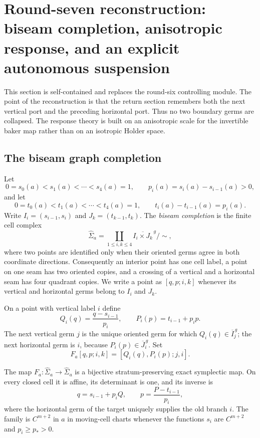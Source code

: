 \section{Round-seven reconstruction: biseam completion, anisotropic response, and an explicit autonomous suspension}
\label{sec:r7-a1}

This section is self-contained and replaces the round-six controlling module.
The point of the reconstruction is that the return section remembers both the
next vertical port and the preceding horizontal port.  Thus no two boundary
germs are collapsed.  The response theory is built on an anisotropic scale for
the invertible baker map rather than on an isotropic Holder space.

\subsection{The biseam graph completion}

Let
\[
0=s_0(a)<s_1(a)<\cdots<s_4(a)=1,
\qquad p_i(a)=s_i(a)-s_{i-1}(a)>0,
\]
and let
\[
0=t_0(a)<t_1(a)<\cdots<t_4(a)=1,
\qquad t_i(a)-t_{i-1}(a)=p_i(a).
\]
Write $I_i=(s_{i-1},s_i)$ and $J_k=(t_{k-1},t_k)$.  The
\emph{biseam completion} is the finite cell complex
\[
 \widehat\Sigma_a=
 \coprod_{1\le i,k\le4}\overline{I_i\times J_k}^{\,g}/\sim,
\]
where two points are identified only when their oriented germs agree in both
coordinate directions.  Consequently an interior point has one cell label,
a point on one seam has two oriented copies, and a crossing of a vertical and
a horizontal seam has four quadrant copies.  We write a point as
$[q,p;i,k]$ whenever its vertical and horizontal germs belong to $I_i$ and
$J_k$.

On a point with vertical label $i$ define
\[
 Q_i(q)=\frac{q-s_{i-1}}{p_i},
 \qquad P_i(p)=t_{i-1}+p_i p.
\]
The next vertical germ $j$ is the unique oriented germ for which
$Q_i(q)\in\overline I_j^{\,g}$; the next horizontal germ is $i$, because
$P_i(p)\in\overline J_i^{\,g}$.  Set
\[
 F_a[q,p;i,k]=[Q_i(q),P_i(p);j,i].
\]

\begin{lemma}
\label{lem:r7-a1-biseam}
The map $F_a:\widehat\Sigma_a\to\widehat\Sigma_a$ is a bijective
stratum-preserving exact symplectic map.  On every closed cell it is affine,
its determinant is one, and its inverse is
\[
 q=s_{i-1}+p_iQ,
 \qquad p=\frac{P-t_{i-1}}{p_i},
\]
where the horizontal germ of the target uniquely supplies the old branch
$i$.  The family is $C^{m+2}$ in $a$ in moving-cell charts whenever the
functions $s_i$ are $C^{m+2}$ and $p_i\ge p_*>0$.
\end{lemma}


